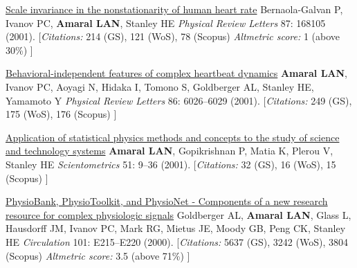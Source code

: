 \NumberedItem{\makebox[0.8cm][r]{[36]}}
\href{/people/amaral/scale-invariance-in-the-nonstationarity-of-human-heart-rate}
{Scale invariance in the nonstationarity of human heart rate}
\newline
Bernaola-Galvan P, Ivanov PC, {\textbf{Amaral LAN}}, Stanley HE
\newline
\textit{Physical Review Letters}
    87:
168105 (2001).
    \newline
    \hfill [{\em{Citations:}} 214 (GS),
    121 (WoS), 78 (Scopus)
        {\hspace*{1cm} \em{Altmetric score:}}  1 (above 30\%)
    ]
\newline
\Gap
~
\Gap

\NumberedItem{\makebox[0.8cm][r]{[35]}}
\href{/people/amaral/behavioral-independence-features-of-complex-heartbeat-dynamics}
{Behavioral-independent features of complex heartbeat dynamics}
\newline
{\textbf{Amaral LAN}}, Ivanov PC, Aoyagi N, Hidaka I, Tomono S, Goldberger AL, Stanley HE, Yamamoto Y
\newline
\textit{Physical Review Letters}
    86:
6026--6029 (2001).
    \newline
    \hfill [{\em{Citations:}} 249 (GS),
    175 (WoS), 176 (Scopus)
    ]
\newline
\Gap
~
\Gap

\NumberedItem{\makebox[0.8cm][r]{[34]}}
\href{/people/amaral/application-of-statistical-physics-methods-and-concepts-to-the-study-of-science-technology-systems}
{Application of statistical physics methods and concepts to the study of science and technology systems}
\newline
{\textbf{Amaral LAN}}, Gopikrishnan P, Matia K, Plerou V, Stanley HE
\newline
\textit{Scientometrics}
    51:
9--36 (2001).
    \newline
    \hfill [{\em{Citations:}} 32 (GS),
    16 (WoS), 15 (Scopus)
    ]
\newline
\Gap
~
\Gap

\NumberedItem{\makebox[0.8cm][r]{[33]}}
\href{/people/amaral/physiobank-physiotoolkit-and-physionet-components-of-a-new-research-resource-for-complex-physiologic-signals}
{PhysioBank, PhysioToolkit, and PhysioNet - Components of a new research resource for complex physiologic signals}
\newline
Goldberger AL, {\textbf{Amaral LAN}}, Glass L, Hausdorff JM, Ivanov PC, Mark RG, Mietus JE, Moody GB, Peng CK, Stanley HE
\newline
\textit{Circulation}
    101:
E215--E220 (2000).
    \newline
    \hfill [{\em{Citations:}} 5637 (GS),
    3242 (WoS), 3804 (Scopus)
        {\hspace*{1cm} \em{Altmetric score:}}  3.5 (above 71\%)
    ]
\newline
\Gap
~
\Gap

